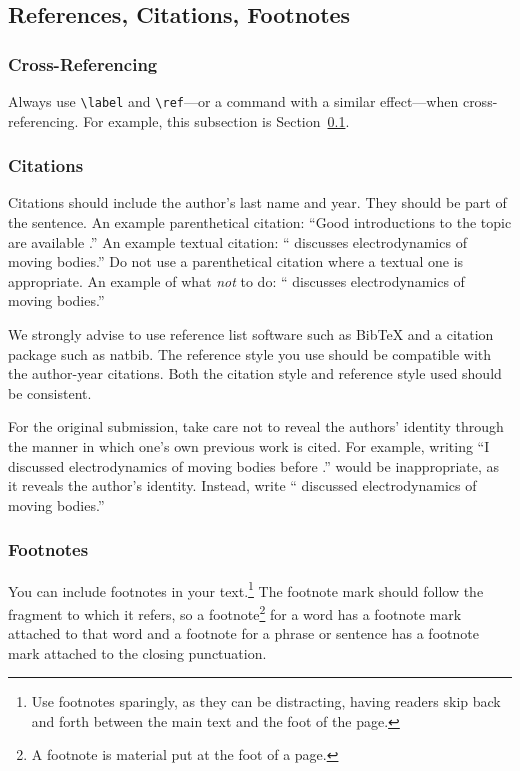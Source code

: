 \documentclass{uai2021} %
\begin{document}
\subsection{References, Citations, Footnotes}\label{sec:etc}
\subsubsection{Cross-Referencing}
Always use \verb|\label| and \verb|\ref|—or a command with a similar effect—when cross-referencing.
For example, this subsection is Section~\ref{sec:etc}.

\subsubsection{Citations}
Citations should include the author's last name and year.
They should be part of the sentence.
An example parenthetical citation: “Good introductions to the topic are available \citep{latexcompanion}.”
An example textual citation: “\citet{einstein} discusses electrodynamics of moving bodies.”
Do not use a parenthetical citation where a textual one is appropriate.
An example of what \emph{not} to do: “\citep{einstein} discusses electrodynamics of moving bodies.”

We strongly advise to use reference list software such as Bib\TeX{} and a citation package such as \textsf{natbib}.
The reference style you use should be compatible with the author-year citations.
Both the citation style and reference style used should be consistent.

For the original submission, take care not to reveal the authors' identity through the manner in which one's own previous work is cited.
For example, writing
“I discussed electrodynamics of moving bodies before \citep{einstein}.” would be inappropriate, as it reveals the author's identity.
Instead, write “\citet{einstein} discussed electrodynamics of moving bodies.”

\subsubsection{Footnotes}
You can include footnotes in your text.\footnote{
    Use footnotes sparingly, as they can be distracting, having readers skip back and forth between the main text and the foot of the page.
}
The footnote mark should follow the fragment to which it refers, so a footnote\footnote{
    A footnote is material put at the foot of a page.
}
for a word has a footnote mark attached to that word and a footnote for a phrase or sentence has a footnote mark attached to the closing punctuation.
\end{document}
